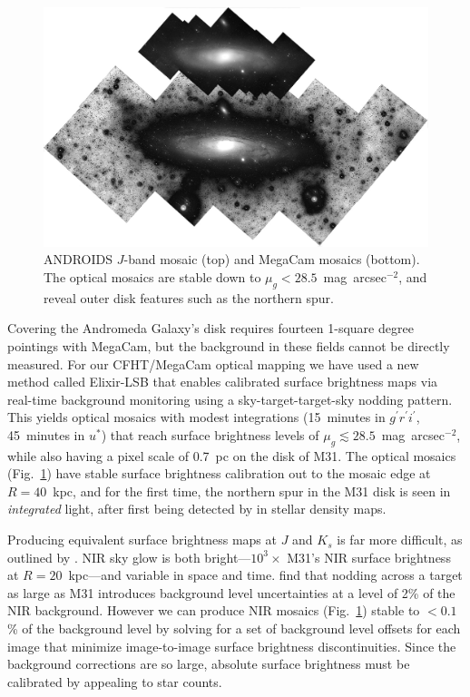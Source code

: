 \documentclass[11pt,twoside]{article}
\begin{document}
\begin{figure}[t]
\centering
\includegraphics[width=\columnwidth]{sickj_fig1}
\caption{ANDROIDS $J$-band mosaic (top) and MegaCam mosaics (bottom). The optical mosaics are stable down to $\mu_g<28.5$~mag~arcsec$^{-2}$, and reveal outer disk features such as the northern spur.}
\label{fig:mosaics}
\end{figure}

Covering the Andromeda Galaxy's disk requires fourteen 1-square degree pointings with MegaCam, but the background in these fields cannot be directly measured.
For our CFHT/MegaCam optical mapping we have used a new method called Elixir-LSB that enables calibrated surface brightness maps via real-time background monitoring  using a sky-target-target-sky nodding pattern.
This yields optical mosaics with modest integrations (15~minutes in $g^\prime r^\prime i^\prime$, 45~minutes in $u^*$) that reach surface brightness levels of $\mu_g \lesssim 28.5$~mag~arcsec$^{-2}$, while also having a pixel scale of 0.7~pc on the disk of M31.
The optical mosaics (Fig.~\ref{fig:mosaics}) have stable surface brightness calibration out to the mosaic edge at $R=40$~kpc, and for the first time, the northern spur in the M31 disk is seen in \emph{integrated} light, after first being detected by \cite{Ferguson:2002} in stellar density maps.

Producing equivalent surface brightness maps at $J$ and $K_s$ is far more difficult, as outlined by \cite{Sick:2013}.
NIR sky glow is both bright---$10^3\times$ M31's NIR surface brightness at $R=20$~kpc---and variable in space and time.
\citeauthor{Sick:2013} find that nodding across a target as large as M31 introduces background level uncertainties at a level of 2\% of the NIR background.
However we can produce NIR mosaics (Fig.~\ref{fig:mosaics}) stable to $<0.1$\% of the background level by solving for a set of background level offsets for each image that minimize image-to-image surface brightness discontinuities.
Since the background corrections are so large, absolute surface brightness must be calibrated by appealing to star counts.
\end{document}
